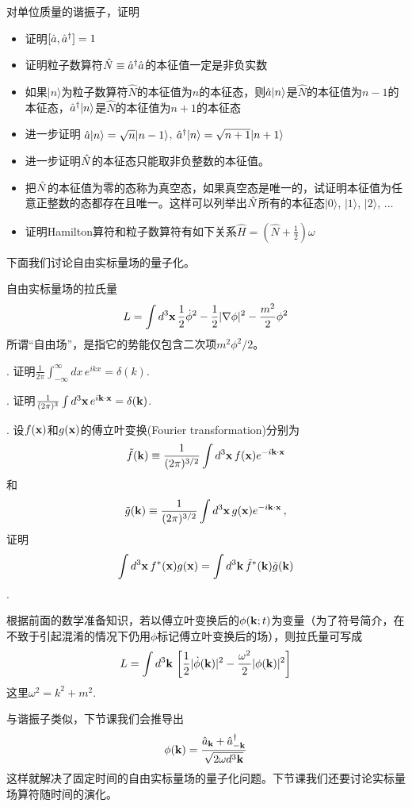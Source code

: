 \documentclass[CJK]{beamer}
\begin{document}
\begin{frame}
\bch
对单位质量的谐振子，证明
\begin{itemize}
\item{证明$[{\hat{a}}, {\hat{a}^\dagger}] = 1$}
\item{证明粒子数算符$\hat{N} \equiv {\hat{a}^\dagger} {\hat{a}}$的本征值一定是非负实数}
\item{如果$|n\rangle$为粒子数算符$\hat{N}$的本征值为$n$的本征态，则${\hat{a}}|n\rangle$是$\hat{N}$的本征值为$n-1$的本征态，${\hat{a}^\dagger}|n\rangle$是$\hat{N}$的本征值为$n+1$的本征态}
\item{进一步证明 ${\hat{a}}|n\rangle = \sqrt{n}|n-1\rangle$, ${\hat{a}^\dagger}|n\rangle = \sqrt{n+1}|n+1\rangle$} 
\item{进一步证明${\hat{N}}$的本征态只能取非负整数的本征值。}
\item{把${\hat{N}}$的本征值为零的态称为真空态，如果真空态是唯一的，试证明本征值为任意正整数的态都存在且唯一。这样可以列举出${\hat{N}}$所有的本征态$|0\rangle$, $|1\rangle$, $|2\rangle$, $\ldots$}
\item{证明Hamilton算符和粒子数算符有如下关系$\hat{H} = (\hat{N} + \frac{1}{2})\omega$}
\end{itemize}
\ech
\end{frame}

\begin{frame}
\bch
下面我们讨论自由实标量场的量子化。

\skipline
自由实标量场的拉氏量
$$L = \int d^3{\mathbf{x}} \, \frac{1}{2}\dot\phi^2 - \frac{1}{2}|\nabla \phi|^2 - \frac{m^2}{2}\phi^2$$
所谓“自由场”，是指它的势能仅包含二次项$m^2\phi^2/2$。

\ech
\end{frame}


\begin{frame}
. 证明$\frac{1}{2\pi}\int_{-\infty}^{\infty} dx\, e^{ikx} = \delta(k)$.

. 证明$\frac{1}{(2\pi)^3}\int d^3{\mathbf{x}}\, e^{i{\mathbf{k}}\cdot{\mathbf{x}}} = \delta({\mathbf{k}})$.


. 设$f({\mathbf{x}})$和$g({\mathbf{x}})$的傅立叶变换(Fourier transformation)分别为
$$\tilde{f}({\mathbf{k}}) \equiv \frac{1}{(2\pi)^{3/2}}\int d^3{\mathbf{x}}\, f({\mathbf{x}})e^{-i{\mathbf{k}}\cdot{\mathbf{x}}}$$和
$$\tilde{g}({\mathbf{k}}) \equiv \frac{1}{(2\pi)^{3/2}}\int d^3{\mathbf{x}}\, g({\mathbf{x}})e^{-i{\mathbf{k}}\cdot{\mathbf{x}}}\,,$$
证明
$$\int d^3{\mathbf{x}}\,f^*({\mathbf{x}})g({\mathbf{x}}) = \int d^3{\mathbf{k}}\, \tilde{f}^*({\mathbf{k}})\tilde{g}({\mathbf{k}})$$.


\ech
\end{frame}

\begin{frame}
\bch
根据前面的数学准备知识，若以傅立叶变换后的$\phi({\mathbf{k}};t)$为变量（为了符号简介，在不致于引起混淆的情况下仍用$\phi$标记傅立叶变换后的场），则拉氏量可写成
$$L = \int d^3{\mathbf{k}} \,\left[\frac{1}{2}|\dot\phi({\mathbf{k}})|^2 - \frac{\omega^2}{2} |\phi({\mathbf{k}})|^2\right]$$
这里$\omega^2 = k^2 + m^2$.

\skipline
与谐振子类似，下节课我们会推导出
$$\phi({\mathbf{k}}) = \frac{{\hat{a}}_{{\mathbf{k}}}+{\hat{a}^\dagger}_{-{\mathbf{k}}}}{\sqrt{2\omega d^3{\mathbf{k}}}}$$
这样就解决了固定时间的自由实标量场的量子化问题。下节课我们还要讨论实标量场算符随时间的演化。
\ech
\end{frame}
\end{document}
